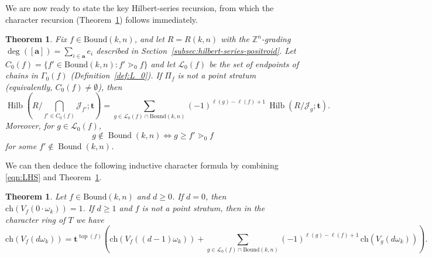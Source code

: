 \documentclass[12pt,reqno]{amsart}
\newtheorem{theorem}[lemma]{Theorem}
\theoremstyle{definition}
\renewcommand{\aa}{\mathbf a}
\newcommand{\cJ}{\mathcal{J}}
\newcommand{\ch}{\mathrm{ch}}
\newcommand{\topp}{\operatorname{top}}
\newcommand{\bound}{\operatorname{Bound}}
\newcommand{\hilb}{\operatorname{Hilb}}
\newcommand{\Lenart}{\mathcal{L}}
\begin{document}
{We are now ready to state the key Hilbert-series recursion, from which the character recursion
(Theorem~\ref{thm:character}) follows immediately.

\begin{theorem}\label{thm:hilbrecur}
Fix \(f\in \mathrm{Bound}(k,n)\), and let \(R=R(k,n)\) with the \(\mathbb Z^n\)-grading
\(\deg([\aa])=\sum_{i\in\aa}e_i\) described in Section~\ref{subsec:hilbert-series-positroid}.
Let \(C_0(f)=\{f'\in \mathrm{Bound}(k,n): f'\gtrdot_0 f\}\) and let \(\Lenart_0(f)\) be the set of endpoints
of chains in \(\Gamma_0(f)\) (Definition~\ref{def:L_0}).
If \(\Pi_f\) is not a point stratum (equivalently, \(C_0(f)\neq\emptyset\)), then
\begin{equation}\label{eq:hilbert-recursion}
\hilb\!\left(R/\bigcap_{f'\in C_0(f)}\cJ_{f'};\mathbf t\right)
=\sum_{g\in \Lenart_0(f)\cap \mathrm{Bound}(k,n)}(-1)^{\ell(g)-\ell(f)+1}\,
\hilb(R/\cJ_{g};\mathbf t).
\end{equation}
Moreover, for $g\in \Lenart_0(f)$,
\begin{equation}\label{eqn:Jun1aaa}
    g\notin \bound(k,n)\iff g\geq f'\gtrdot_0 f
\end{equation}
for some $f'\notin \bound(k,n)$.
\end{theorem}


We can then deduce the following inductive character formula by combining \eqref{eqn:LHS}  and Theorem~\ref{thm:hilbrecur}.


\begin{theorem}\label{thm:character}
Let \(f\in \mathrm{Bound}(k,n)\) and \(d\ge 0\).
If \(d=0\), then \(\ch(V_f(0\cdot \omega_k))=1\).
If \(d\ge 1\) and \(f\) is not a point stratum, then in the character ring of \(T\) we have
\begin{equation}\label{eq:character-formula}
\ch(V_f(d\omega_k))
=
\mathbf t^{\topp(f)}\left(
\ch(V_f((d-1)\omega_k))
+
\sum_{g\in \Lenart_0(f)\cap \mathrm{Bound}(k,n)}
(-1)^{\ell(g)-\ell(f)+1}\,
\ch(V_g(d\omega_k))
\right).
\end{equation}
\end{theorem}

}
\end{document}
